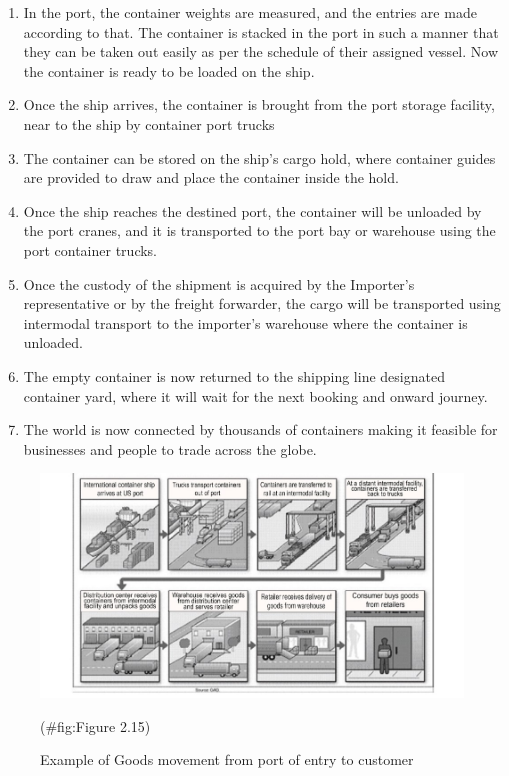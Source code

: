 \documentclass[
]{book}
\begin{document}
\begin{enumerate}
\def\labelenumi{\arabic{enumi})}
\item
  In the port, the container weights are measured, and the entries are made according to that. The container is stacked in the port in such a manner that they can be taken out easily as per the schedule of their assigned vessel. Now the container is ready to be loaded on the ship.
\item
  Once the ship arrives, the container is brought from the port storage facility, near to the ship by container port trucks
\item
  The container can be stored on the ship's cargo hold, where container guides are provided to draw and place the container inside the hold.
\item
  Once the ship reaches the destined port, the container will be unloaded by the port cranes, and it is transported to the port bay or warehouse using the port container trucks.
\item
  Once the custody of the shipment is acquired by the Importer's representative or by the freight forwarder, the cargo will be transported using intermodal transport to the importer's warehouse where the container is unloaded.
\item
  The empty container is now returned to the shipping line designated container yard, where it will wait for the next booking and onward journey.
\item
  The world is now connected by thousands of containers making it feasible for businesses and people to trade across the globe.
\end{enumerate}

\begin{figure}

{\centering \includegraphics{./Images/Intro/Example of Goods movement from port of entry to customer} 

}

\caption{Example of Goods movement from port of entry to customer}(\#fig:Figure 2.15)
\end{figure}
\end{document}
